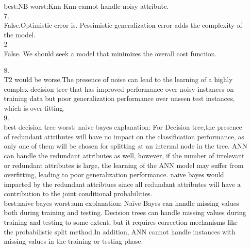 \documentclass[12pt]{article}
\begin{document}
best:NB
worst:Knn
Knn cannot handle noisy attribute.\\

7.\\

False.Optimistic error is. Pessimistic generalization error adds the complexity of the model.\\

2\\

False. We should seek a model that minimizes the
overall cost function.

8.\\

T2 would be worse.The presence of noise can lead to the learning of a highly complex decision tree that has improved performance over noisy instances on training data but poor generalization performance over unseen test instances, which is over-fitting.\\

9.\\

best decision tree
worst: naive bayes
explanation:
For Decision tree,the presence of redundant attributes will have no impact
on the classification performance, as only one of them will be chosen for splitting at an internal node in the tree. ANN can handle the redundant attributes as well, however,  if the number of irrelevant or redundant attributes is large, the learning of the ANN model may suffer from overfitting, leading to poor generalization performance.
naive bayes would impacted by the redundant attribtues since all redundant attributes will have a contribution to the joint conditional probabilities.\\

best:naive bayes
worst:ann
explanation:
Naïve Bayes can handle missing values both during training and testing. Decision trees
can handle missing values during training and testing to some extent, but it requires correction
mechanisms like the probabilistic split method.In addition, ANN cannot handle instances with missing values in the training or testing phase.
\end{document}
